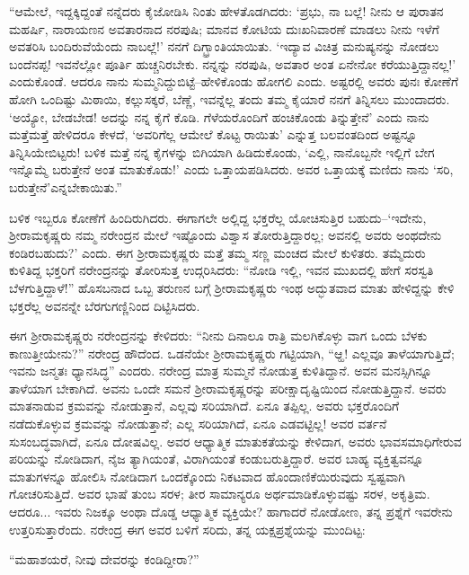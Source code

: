 “ಆಮೇಲೆ, ಇದ್ದಕ್ಕಿದ್ದಂತೆ ನನ್ನೆದರು ಕೈಜೋಡಿಸಿ ನಿಂತು ಹೇಳತೊಡಗಿದರು: ‘ಪ್ರಭು, ನಾ ಬಲ್ಲೆ! ನೀನು ಆ ಪುರಾತನ ಮಹರ್ಷಿ, ನಾರಾಯಣನ ಅವತಾರನಾದ ನರಪುಷಿ; ಮಾನವ ಕೋಟಿಯ ದುಃಖನಿವಾರಣೆ ಮಾಡಲು ನೀನು ಇಳೆಗೆ ಅವತರಿಸಿ ಬಂದಿರುವೆಯೆಂದು ನಾಬಲ್ಲೆ!’ ನನಗೆ ದಿಗ್ಭ್ರಾಂತಿಯಾಯಿತು. ‘ಇದ್ಯಾವ ವಿಚಿತ್ರ ಮನುಷ್ಯನನ್ನು ನೋಡಲು ಬಂದೆನಪ್ಪ! ಇವನೆಲ್ಲೋ ಪೂರ್ತಿ ಹುಚ್ಚನಿರಬೇಕು. ನನ್ನನ್ನು ನರಪುಷಿ, ಅವತಾರ ಅಂತ ಏನೇನೋ ಕರೆಯುತ್ತಿದ್ದಾನಲ್ಲ!’ ಎಂದುಕೊಂಡೆ. ಆದರೂ ನಾನು ಸುಮ್ಮನಿದ್ದುಬಿಟ್ಟೆ–ಹೇಳಿಕೊಂಡು ಹೋಗಲಿ ಎಂದು. ಅಷ್ಟರಲ್ಲಿ ಅವರು ಪುನಃ ಕೋಣೆಗೆ ಹೋಗಿ ಒಂದಿಷ್ಟು ಮಿಠಾಯಿ, ಕಲ್ಲುಸಕ್ಕರೆ, ಬೆಣ್ಣೆ, ಇವನ್ನೆಲ್ಲ ತಂದು ತಮ್ಮ ಕೈಯಾರೆ ನನಗೆ ತಿನ್ನಿಸಲು ಮುಂದಾದರು. ‘ಅಯ್ಯೋ, ಬೇಡಬೇಡ! ಅದನ್ನು ನನ್ನ ಕೈಗೆ ಕೊಡಿ. ಗೆಳೆಯರೊಂದಿಗೆ ಹಂಚಿಕೊಂಡು ತಿನ್ನುತ್ತೇನೆ’ ಎಂದು ನಾನು ಮತ್ತೆಮತ್ತೆ ಹೇಳಿದರೂ ಕೇಳದೆ, ‘ಅವರಿಗೆಲ್ಲ ಆಮೇಲೆ ಕೊಟ್ಟ ರಾಯಿತು’ ಎನ್ನುತ್ತ ಬಲವಂತದಿಂದ ಅಷ್ಟನ್ನೂ ತಿನ್ನಿಸಿಯೇಬಿಟ್ಟರು! ಬಳಿಕ ಮತ್ತೆ ನನ್ನ ಕೈಗಳನ್ನು ಬಿಗಿಯಾಗಿ ಹಿಡಿದುಕೊಂಡು, ‘ಎಲ್ಲಿ, ನಾನೊಬ್ಬನೇ ಇಲ್ಲಿಗೆ ಬೇಗ ಇನ್ನೊಮ್ಮೆ ಬರುತ್ತೇನೆ ಅಂತ ಮಾತುಕೊಡು!’ ಎಂದು ಒತ್ತಾಯಪಡಿಸಿದರು. ಅವರ ಒತ್ತಾಯಕ್ಕೆ ಮಣಿದು ನಾನು ‘ಸರಿ, ಬರುತ್ತೇನೆ’ಎನ್ನಬೇಕಾಯಿತು.”

ಬಳಿಕ ಇಬ್ಬರೂ ಕೋಣೆಗೆ ಹಿಂದಿರುಗಿದರು. ಈಗಾಗಲೇ ಅಲ್ಲಿದ್ದ ಭಕ್ತರೆಲ್ಲ ಯೋಚಿಸುತ್ತಿರ ಬಹುದು–‘ಇದೇನು, ಶ್ರೀರಾಮಕೃಷ್ಣರು ನಮ್ಮ ನರೇಂದ್ರನ ಮೇಲೆ ಇಷ್ಟೊಂದು ವಿಶ್ವಾಸ ತೋರುತ್ತಿದ್ದಾರಲ್ಲ; ಅವನಲ್ಲಿ ಅವರು ಅಂಥದೇನು ಕಂಡಿರಬಹುದು?’ ಎಂದು. ಈಗ ಶ್ರೀರಾಮಕೃಷ್ಣರು ಮತ್ತೆ ತಮ್ಮ ಸಣ್ಣ ಮಂಚದ ಮೇಲೆ ಕುಳಿತರು. ತಮ್ಮೆದುರು ಕುಳಿತಿದ್ದ ಭಕ್ತರಿಗೆ ನರೇಂದ್ರನನ್ನು ತೋರಿಸುತ್ತ ಉದ್ಗರಿಸಿದರು: “ನೋಡಿ ಇಲ್ಲಿ, ಇವನ ಮುಖದಲ್ಲಿ ಹೇಗೆ ಸರಸ್ವತಿ ಬೆಳಗುತ್ತಿದ್ದಾಳೆ!” ಹೊಸಬನಾದ ಒಬ್ಬ ತರುಣನ ಬಗ್ಗೆ ಶ್ರೀರಾಮಕೃಷ್ಣರು ಇಂಥ ಅದ್ಭುತವಾದ ಮಾತು ಹೇಳಿದ್ದನ್ನು ಕೇಳಿ ಭಕ್ತರೆಲ್ಲ ಅವನನ್ನೇ ಬೆರಗುಗಣ್ಣಿನಿಂದ ದಿಟ್ಟಿಸಿದರು. 

ಈಗ ಶ್ರೀರಾಮಕೃಷ್ಣರು ನರೇಂದ್ರನನ್ನು ಕೇಳಿದರು: “ನೀನು ದಿನಾಲೂ ರಾತ್ರಿ ಮಲಗಿಕೊಳ್ಳು ವಾಗ ಒಂದು ಬೆಳಕು ಕಾಣುತ್ತೀಯೇನು?” ನರೇಂದ್ರ ಹೌದೆಂದ. ಒಡನೆಯೇ ಶ್ರೀರಾಮಕೃಷ್ಣರು ಗಟ್ಟಿಯಾಗಿ, “ಆ್ಹ! ಎಲ್ಲವೂ ತಾಳೆಯಾಗುತ್ತಿದೆ; ಇವನು ಜನ್ಮತಃ ಧ್ಯಾನಸಿದ್ಧ” ಎಂದರು. ನರೇಂದ್ರ ಮಾತ್ರ ಸುಮ್ಮನೆ ನೋಡುತ್ತ ಕುಳಿತಿದ್ದಾನೆ. ಅವನ ಮನಸ್ಸಿಗಿನ್ನೂ ತಾಳೆಯಾಗ ಬೇಕಾಗಿದೆ. ಅವನು ಒಂದೇ ಸಮನೆ ಶ್ರೀರಾಮಕೃಷ್ಣರನ್ನು ಪರೀಕ್ಷಾದೃಷ್ಟಿಯಿಂದ ನೋಡುತ್ತಿದ್ದಾನೆ. ಅವರು ಮಾತನಾಡುವ ಕ್ರಮವನ್ನು ನೋಡುತ್ತಾನೆ, ಎಲ್ಲವು ಸರಿಯಾಗಿದೆ. ಏನೂ ತಪ್ಪಿಲ್ಲ. ಅವರು ಭಕ್ತರೊಂದಿಗೆ ನಡೆದುಕೊಳ್ಳುವ ಕ್ರಮವನ್ನು ನೋಡುತ್ತಾನೆ; ಎಲ್ಲ ಸರಿಯಾಗಿದೆ, ಏನೂ ಎಡವಟ್ಟಿಲ್ಲ! ಅವರ ವರ್ತನೆ ಸುಸಂಬದ್ಧವಾಗಿದೆ, ಏನೂ ದೋಷವಿಲ್ಲ. ಅವರ ಆಧ್ಯಾತ್ಮಿಕ ಮಾತುಕತೆಯನ್ನು ಕೇಳಿದಾಗ, ಅವರು ಭಾವಸಮಾಧಿಗೇರುವ ಪರಿಯನ್ನು ನೋಡಿದಾಗ, ನೈಜ ತ್ಯಾಗಿಯಂತೆ, ವಿರಾಗಿಯಂತೆ ಕಂಡುಬರುತ್ತಿದ್ದಾರೆ. ಅವರ ಬಾಹ್ಯ ವ್ಯಕ್ತಿತ್ವವನ್ನೂ ಮಾತುಗಳನ್ನೂ ಹೋಲಿಸಿ ನೋಡಿದಾಗ ಒಂದಕ್ಕೊಂದು ನಿಕಟವಾದ ಹೊಂದಾಣಿಕೆಯಿರುವುದು ಸ್ವಷ್ಟವಾಗಿ ಗೋಚರಿಸುತ್ತಿದೆ. ಅವರ ಭಾಷೆ ತುಂಬ ಸರಳ; ತೀರ ಸಾಮಾನ್ಯರೂ ಅರ್ಥಮಾಡಿಕೊಳ್ಳುವಷ್ಟು ಸರಳ, ಅಕೃತ್ರಿಮ. ಆದರೂ... ಇವರು ನಿಜಕ್ಕೂ ಅಂಥಾ ದೊಡ್ಡ ಆಧ್ಯಾತ್ಮಿಕ ವ್ಯಕ್ತಿಯೇ? ಹಾಗಾದರೆ ನೋಡೋಣ, ತನ್ನ ಪ್ರಶ್ನೆಗೆ ಇವರೇನು ಉತ್ತರಿಸುತ್ತಾರೆಂದು. ನರೇಂದ್ರ ಈಗ ಅವರ ಬಳಿಗೆ ಸರಿದು, ತನ್ನ ಯಕ್ಷಪ್ರಶ್ನೆಯನ್ನು ಮುಂದಿಟ್ಟ:

“ಮಹಾಶಯರೆ, ನೀವು ದೇವರನ್ನು ಕಂಡಿದ್ದೀರಾ?”

